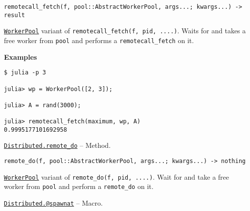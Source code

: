\begin{adjustwidth}{2em}{0pt}


\begin{verbatim}
remotecall_fetch(f, pool::AbstractWorkerPool, args...; kwargs...) -> result
\end{verbatim}

\hyperlink{17976394752057970100}{\texttt{WorkerPool}} variant of \texttt{remotecall\_fetch(f, pid, ....)}. Waits for and takes a free worker from \texttt{pool} and performs a \texttt{remotecall\_fetch} on it.

\textbf{Examples}


\begin{verbatim}
$ julia -p 3

julia> wp = WorkerPool([2, 3]);

julia> A = rand(3000);

julia> remotecall_fetch(maximum, wp, A)
0.9995177101692958
\end{verbatim}



\end{adjustwidth}
\hypertarget{9355776911888896083}{} 
\hyperlink{9355776911888896083}{\texttt{Distributed.remote\_do}}  -- {Method.}

\begin{adjustwidth}{2em}{0pt}


\begin{verbatim}
remote_do(f, pool::AbstractWorkerPool, args...; kwargs...) -> nothing
\end{verbatim}

\hyperlink{17976394752057970100}{\texttt{WorkerPool}} variant of \texttt{remote\_do(f, pid, ....)}. Wait for and take a free worker from \texttt{pool} and perform a \texttt{remote\_do} on it.



\end{adjustwidth}
\hypertarget{11231712027010946923}{} 
\hyperlink{11231712027010946923}{\texttt{Distributed.@spawnat}}  -- {Macro.}

